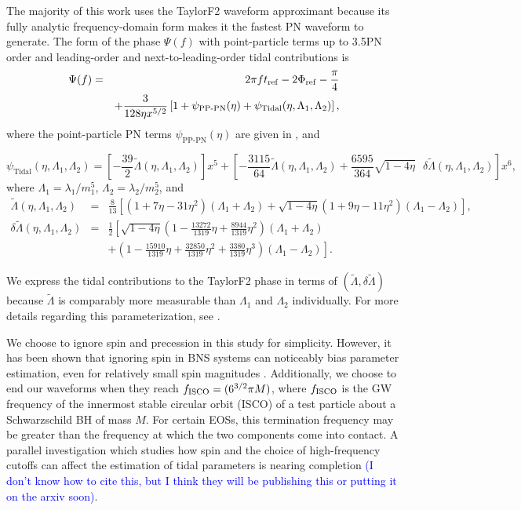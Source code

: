 \documentclass[twocolumn,prd,amssymb,aps,nofootinbib,showpacs,epsf]{revtex4}
\newcommand\les[2]{\textcolor{blue}{{#1}\sout{#2}}}
\begin{document}
The majority of this work uses the TaylorF2 waveform approximant because its fully analytic frequency-domain form makes it the fastest PN waveform to generate.  The form of the phase $\Psi(f)$ with point-particle terms up to 3.5PN order and leading-order and next-to-leading-order tidal contributions is
\begin{eqnarray}
\Psi(f)&=&2\pi f t_{\rm ref} - 2\Phi_{\rm ref} -\frac{\pi}{4}\\
\nonumber
&&+\frac{3}{128\eta x^{5/2}}\left[1+\psi_\text{PP-PN}(\eta)+\psi_\text{Tidal}(\eta,\Lambda_1,\Lambda_2)\right],
\end{eqnarray}
where the point-particle PN terms $\psi_\text{PP-PN}(\eta)$ are given in \cite{BuonannoIyerOchsner2009}, and
\begin{widetext}
\begin{equation}
\label{eq:psi_tidal}
\psi_\text{Tidal}(\eta,\Lambda_1,\Lambda_2)=\left[-\frac{39}{2}\tilde{\Lambda}(\eta,\Lambda_1,\Lambda_2)\right]x^5+ \left[-\frac{3115}{64}\tilde{\Lambda}(\eta,\Lambda_1,\Lambda_2)+\frac{6595}{364}\sqrt{1-4\eta}\mbox{ }\delta\tilde{\Lambda}(\eta,\Lambda_1,\Lambda_2)\right]x^6,
\end{equation}
where $\Lambda_1=\lambda_1/m_1^5$, $\Lambda_2=\lambda_2/m_2^5$, and
\begin{eqnarray}
\label{eq:LT}
\tilde{\Lambda}(\eta,\Lambda_1,\Lambda_2)&=&\frac{8}{13}\left[\left(1+7\eta-31\eta^2\right)\left(\Lambda_1+\Lambda_2\right)+\sqrt{1-4\eta}\left(1+9\eta-11\eta^2\right)\left(\Lambda_1-\Lambda_2\right)\right],\\
\label{eq:dLT}
\delta\tilde{\Lambda}(\eta,\Lambda_1,\Lambda_2)&=&\frac{1}{2}\left[\sqrt{1-4\eta}\left(1-\frac{13272}{1319}\eta+\frac{8944}{1319}\eta^2\right)\left(\Lambda_1+\Lambda_2\right) \right .\\
&& + \left . \left(1-\frac{15910}{1319}\eta+\frac{32850}{1319}\eta^2+\frac{3380}{1319}\eta^3\right)\left(\Lambda_1-\Lambda_2\right)\right].
\end{eqnarray}
\end{widetext}
We express the tidal contributions to the TaylorF2 phase in terms of $(\tilde\Lambda,\delta\tilde\Lambda)$ because $\tilde\Lambda$ is comparably more measurable than $\Lambda_1$ and $\Lambda_2$ individually.  For more details regarding this parameterization, see \cite{WadeCreightonOchsner2014,Favata2014}.

We choose to ignore spin and precession in this study for simplicity.  However, it has been shown that ignoring spin in BNS systems can noticeably bias parameter estimation, even for relatively small spin magnitudes \cite{Favata2014}.  Additionally, we choose to end our waveforms when they reach $f_{\rm ISCO}=(6^{3/2}\pi M)$, where $f_{\rm ISCO}$ is the GW frequency of the innermost stable circular orbit (ISCO) of a test particle about a Schwarzschild BH of mass $M$.  For certain EOSs, this termination frequency may be greater than the frequency at which the two components come into contact.  A parallel investigation which studies how spin and the choice of high-frequency cutoffs can affect the estimation of tidal parameters is nearing completion \cite{Nikhef_paper_2} \les{(I don't know how to cite this, but I think they will be publishing this or putting it on the arxiv soon)}{}.
\end{document}
